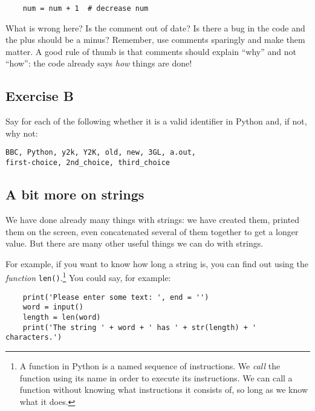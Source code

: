 \begin{verbatim}
    num = num + 1  # decrease num
\end{verbatim}

What is wrong here? Is the comment out of date? Is there a bug in the
code and the plus should be a minus? Remember, use comments sparingly
and make them matter. A good rule of thumb is that comments should
explain ``why'' and not ``how'': the code already says \emph{how}
things are done! 

\subsection*{Exercise B}

Say for each of the following whether it is a valid identifier
in Python and, if not, why not:
\begin{Verbatim}
BBC, Python, y2k, Y2K, old, new, 3GL, a.out, 
first-choice, 2nd_choice, third_choice
\end{Verbatim}

\subsection{A bit more on strings}

We have done already many things with strings: we have
created them, printed them on the screen, even concatenated several of
them together to get a longer value. But there are many other useful
things we can do with strings.

For example, if you want to know how long a string is, you can find
out using the \emph{function} \verb!len()!.\footnote{A function
in Python is a named sequence of instructions. We 
\emph{call} the function using its name in order to execute its instructions.
We can call a function without knowing what instructions it consists of, so
long as we know what it does.}
You could say, for example:

\begin{Verbatim}
    print('Please enter some text: ', end = '')
    word = input()
    length = len(word)
    print('The string ' + word + ' has ' + str(length) + ' characters.')
\end{Verbatim}

